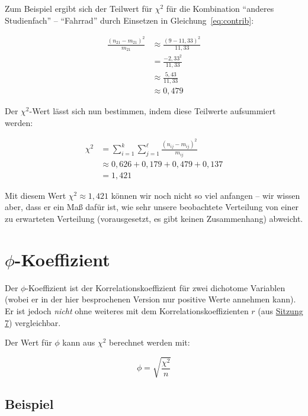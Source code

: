 \documentclass[
  11pt,
  ngerman,
  a4paper,
]{report}
\begin{document}
Zum Beispiel ergibt sich der Teilwert für \(\chi^2\) für die Kombination \enquote{anderes Studienfach} -- \enquote{Fahrrad} durch Einsetzen in Gleichung~\eqref{eq:contrib}:

\nopagebreak

\[
\begin{aligned}
\frac{(n_{21}-m_{21})^{2}}{m_{21}} &\approx \frac{(9-11{,}33)^2}{11{,}33}\\
&=\frac{-2{,}33^2}{11{,}33}\\
&\approx\frac{5{,}43}{11{,}33}\\
&\approx0{,}479
\end{aligned}
\]

Der \(\chi^2\)-Wert lässt sich nun bestimmen, indem diese Teilwerte aufsummiert werden:

\[
\begin{aligned}
\chi^2&= \sum_{i=1}^{k}\sum_{j=1}^{\ell}\frac{(n_{ij}-m_{ij})^{2}}{m_{ij}}\\[4pt]
&\approx 0{,}626 + 0{,}179 + 0{,}479 + 0{,}137\\
& =1{,}421
\end{aligned}
\]

Mit diesem Wert \(\chi^2\approx1{,}421\) können wir noch nicht so viel anfangen -- wir wissen aber, dass er ein Maß dafür ist, wie sehr unsere beobachtete Verteilung von einer zu erwarteten Verteilung (vorausgesetzt, es gibt keinen Zusammenhang) abweicht.

\hypertarget{phi-koeffizient}{%
\section{\texorpdfstring{\(\phi\)-Koeffizient}{\textbackslash phi-Koeffizient}}\label{phi-koeffizient}}

Der \(\phi\)-Koeffizient ist der Korrelationskoeffizient für zwei dichotome Variablen (wobei er in der hier besprochenen Version nur positive Werte annehmen kann). Er ist jedoch \emph{nicht} ohne weiteres mit dem Korrelationskoeffizienten \(r\) (aus \protect\hyperlink{korrelationskoeffizient}{Sitzung 7}) vergleichbar.

Der Wert für \(\phi\) kann aus \(\chi^2\) berechnet werden mit:

\nopagebreak

\[
\phi=\sqrt{\frac{\chi^2}{n}}
\label{eq:phi}
\]

\hypertarget{beispiel-33}{%
\subsection{Beispiel}\label{beispiel-33}}
\end{document}
